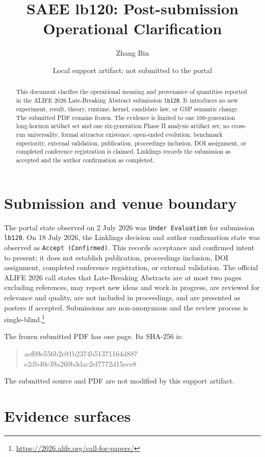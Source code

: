 \documentclass[10pt]{article}
\title{\vspace{-1.5em}SAEE lb120: Post-submission Operational Clarification}
\author{Zhang Bin}
\date{Local support artifact; not submitted to the portal}
\begin{document}
\maketitle

\begin{abstract}
This document clarifies the operational meaning and provenance of quantities
reported in the ALIFE 2026 Late-Breaking Abstract submission \texttt{lb120}.
It introduces no new experiment, result, theory, runtime, kernel, candidate
law, or GSP semantic change. The submitted PDF remains frozen. The evidence is
limited to one 100-generation long-horizon artifact set and one six-generation
Phase II analysis artifact set; no cross-run universality, formal attractor
existence, open-ended evolution, benchmark superiority, external validation,
publication, proceedings inclusion, DOI assignment, or completed conference
registration is claimed. Linklings records the submission as accepted and the
author confirmation as completed.
\end{abstract}

\section{Submission and venue boundary}

The portal state observed on 2 July 2026 was \texttt{Under Evaluation} for
submission \texttt{lb120}. On 18 July 2026, the Linklings decision and author
confirmation state was observed as \texttt{Accept (Confirmed)}. This records
acceptance and confirmed intent to present; it does not establish publication,
proceedings inclusion, DOI assignment, completed conference registration, or
external validation. The official ALIFE 2026 call states that Late-Breaking Abstracts are at most two
pages excluding references, may report new ideas and work in progress, are
reviewed for relevance and quality, are not included in proceedings, and are
presented as posters if accepted. Submissions are non-anonymous and the review
process is single-blind.\footnote{\url{https://2026.alife.org/call-for-papers/}}

The frozen submitted PDF has one page. Its SHA-256 is:
\begin{quote}\small\ttfamily
aef09e556b2e91b2374b51371164d887\\
e2db40c39a260b3dac2ef7772d15ece8
\end{quote}
The submitted source and PDF are not modified by this support artifact.

\section{Evidence surfaces}
\end{document}
